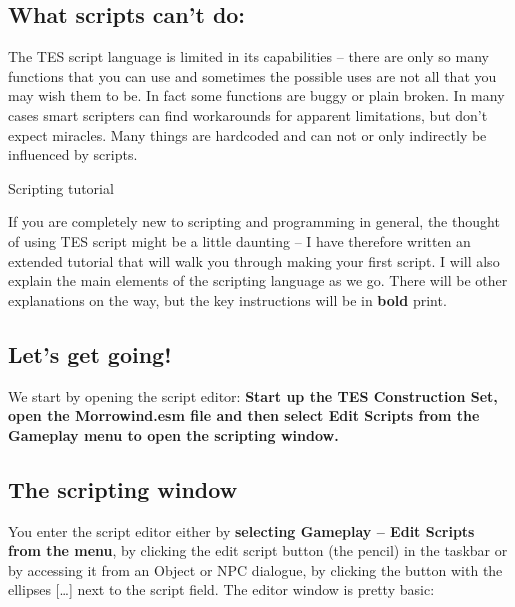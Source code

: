 \documentclass[
]{article}
\begin{document}
\hypertarget{what-scripts-cant-do}{%
\subsection{What scripts can't do:}\label{what-scripts-cant-do}}

The TES script language is limited in its capabilities -- there are only
so many functions that you can use and sometimes the possible uses are
not all that you may wish them to be. In fact some functions are buggy
or plain broken. In many cases smart scripters can find workarounds for
apparent limitations, but don't expect miracles. Many things are
hardcoded and can not or only indirectly be influenced by scripts.

\protect\hypertarget{_Toc53412554}{}{}Scripting tutorial

If you are completely new to scripting and programming in general, the
thought of using TES script might be a little daunting -- I have
therefore written an extended tutorial that will walk you through making
your first script. I will also explain the main elements of the
scripting language as we go. There will be other explanations on the
way, but the key instructions will be in \textbf{bold} print.

\hypertarget{lets-get-going}{%
\subsection{Let's get going!}\label{lets-get-going}}

We start by opening the script editor: \textbf{Start up the TES
Construction Set, open the Morrowind.esm file and then select Edit
Scripts from the Gameplay menu to open the scripting window.}

\hypertarget{the-scripting-window}{%
\subsection{The scripting window}\label{the-scripting-window}}

You enter the script editor either by \textbf{selecting Gameplay -- Edit
Scripts from the menu}, by clicking the edit script button (the pencil)
in the taskbar or by accessing it from an Object or NPC dialogue, by
clicking the button with the ellipses {[}\ldots{]} next to the script
field. The editor window is pretty basic:
\end{document}
